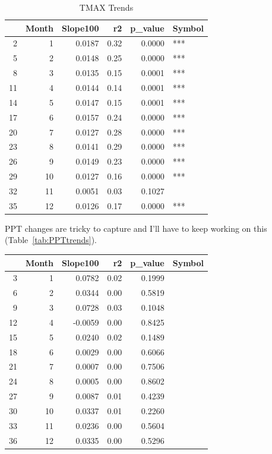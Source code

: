 \documentclass{article}\usepackage[]{graphicx}\usepackage[]{color}
\begin{document}
\begin{table}[ht]
\centering
\begin{tabular}{rrrrrl}
  \hline
 & Month & Slope100 & r2 & p\_value & Symbol \\ 
  \hline
2 & 1 & 0.0187 & 0.32 & 0.0000 & *** \\ 
  5 & 2 & 0.0148 & 0.25 & 0.0000 & *** \\ 
  8 & 3 & 0.0135 & 0.15 & 0.0001 & *** \\ 
  11 & 4 & 0.0144 & 0.14 & 0.0001 & *** \\ 
  14 & 5 & 0.0147 & 0.15 & 0.0001 & *** \\ 
  17 & 6 & 0.0157 & 0.24 & 0.0000 & *** \\ 
  20 & 7 & 0.0127 & 0.28 & 0.0000 & *** \\ 
  23 & 8 & 0.0141 & 0.29 & 0.0000 & *** \\ 
  26 & 9 & 0.0149 & 0.23 & 0.0000 & *** \\ 
  29 & 10 & 0.0127 & 0.16 & 0.0000 & *** \\ 
  32 & 11 & 0.0051 & 0.03 & 0.1027 &  \\ 
  35 & 12 & 0.0126 & 0.17 & 0.0000 & *** \\ 
   \hline
\end{tabular}
\caption{TMAX Trends} 
\end{table}


PPT changes are tricky to capture and I'll have to keep working on this (Table~\ref{tab:PPTtrends}).

\begin{table}[ht]
\centering
\begin{tabular}{rrrrrl}
  \hline
 & Month & Slope100 & r2 & p\_value & Symbol \\ 
  \hline
3 & 1 & 0.0782 & 0.02 & 0.1999 &  \\ 
  6 & 2 & 0.0344 & 0.00 & 0.5819 &  \\ 
  9 & 3 & 0.0728 & 0.03 & 0.1048 &  \\ 
  12 & 4 & -0.0059 & 0.00 & 0.8425 &  \\ 
  15 & 5 & 0.0240 & 0.02 & 0.1489 &  \\ 
  18 & 6 & 0.0029 & 0.00 & 0.6066 &  \\ 
  21 & 7 & 0.0007 & 0.00 & 0.7506 &  \\ 
  24 & 8 & 0.0005 & 0.00 & 0.8602 &  \\ 
  27 & 9 & 0.0087 & 0.01 & 0.4239 &  \\ 
  30 & 10 & 0.0337 & 0.01 & 0.2260 &  \\ 
  33 & 11 & 0.0236 & 0.00 & 0.5604 &  \\ 
  36 & 12 & 0.0335 & 0.00 & 0.5296 &  \\ 
   \hline
\end{tabular}
\end{table}
\end{document}
